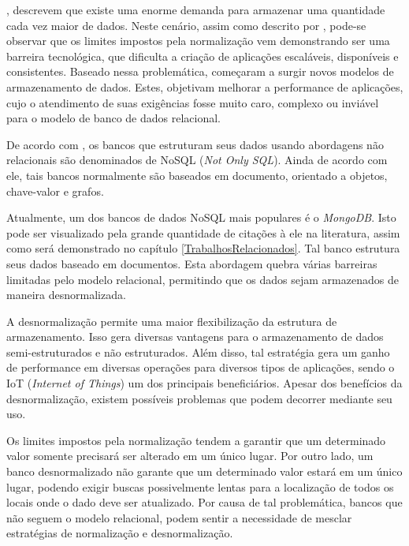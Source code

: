 , descrevem que existe uma enorme demanda para armazenar uma quantidade cada vez maior de dados. Neste cenário, assim como descrito por , pode-se observar que os limites impostos pela normalização vem demonstrando ser uma barreira tecnológica, que dificulta a criação de aplicações escaláveis, disponíveis e consistentes. Baseado nessa problemática, começaram a surgir novos modelos de armazenamento de dados. Estes, objetivam melhorar a performance de aplicações, cujo o atendimento de suas exigências fosse muito caro, complexo ou inviável para o modelo de banco de dados relacional.

De acordo com , os bancos que estruturam seus dados usando abordagens não relacionais são denominados de NoSQL (\textit{Not Only SQL}). Ainda de acordo com ele, tais bancos normalmente são baseados em documento, orientado a objetos, chave-valor e grafos.

Atualmente, um dos bancos de dados NoSQL mais populares é o \textit{MongoDB}. Isto pode ser visualizado pela grande quantidade de citações à ele na literatura, assim como será demonstrado no capítulo \ref{TrabalhosRelacionados}.
Tal banco estrutura seus dados baseado em documentos. Esta abordagem quebra várias barreiras limitadas pelo modelo relacional, permitindo que os dados sejam armazenados de maneira desnormalizada.

A desnormalização permite uma maior flexibilização da estrutura de armazenamento. Isso gera diversas vantagens para o armazenamento de dados semi-estruturados e não estruturados. Além disso, tal estratégia gera um ganho de performance em diversas operações para diversos tipos de aplicações, sendo o IoT (\textit{Internet of Things}) um dos principais beneficiários. Apesar dos benefícios da desnormalização, existem possíveis problemas que podem decorrer mediante seu uso.

Os limites impostos pela normalização tendem a garantir que um determinado valor somente precisará ser alterado em um único lugar. Por outro lado, um banco desnormalizado não garante que um determinado valor estará em um único lugar, podendo exigir buscas possivelmente lentas para a localização de todos os locais onde o dado deve ser atualizado. Por causa de tal problemática, bancos que não seguem o modelo relacional, podem sentir a necessidade de mesclar estratégias de normalização e desnormalização.

